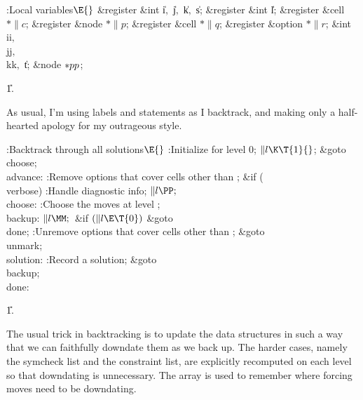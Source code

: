 \B{}:Local variables\X${}\E{}$\6
\&{register} \&{int} \|i${},{}$ \|j${},{}$ \|k${},{}$ \|s;\6
\&{register} \&{int} \|l;\6
\&{register} \&{cell} ${}{*}\|c{}$;\6
\&{register} \&{node} ${}{*}\|p{}$;\6
\&{register} \&{cell} ${}{*}\|q{}$;\6
\&{register} \&{option} ${}{*}\|r{}$;\6
\&{int} \\{ii}${},{}$ \\{jj}${},{}$ \\{kk}${},{}$ \|t;\6
\&{node} ${}{*}\\{pp}{}$;\par
\U1.\fi

As usual, I'm using labels and  statements as I backtrack,
and making only a half-hearted apology for my outrageous style.

\Y\B\4:Backtrack through all solutions\X${}\E{}$\6
:Initialize for level 0\X;\6
${}\|l\K\T{1}{}$;\5
\&{goto} \\{choose};\6
\4\\{advance}:\5
:Remove options that cover cells other than \X;\6
\&{if} (\\{verbose})\1\5
:Handle diagnostic info\X;\2\6
${}\|l\PP;{}$\6
\4\\{choose}:\5
:Choose the moves at level \X;\6
\4\\{backup}:\5
${}\|l\MM;{}$\6
\&{if} ${}(\|l\E\T{0}){}$\1\5
\&{goto} \\{done};\2\6
:Unremove options that cover cells other than \X;\6
\&{goto} \\{unmark};\6
\4\\{solution}:\5
:Record a solution\X;\6
\&{goto} \\{backup}; \\{done}:\par
\U1.\fi

The usual trick in backtracking is to update the data structures in such
a
way that we can faithfully downdate them as we back up. The harder cases,
namely the symcheck list and the constraint list, are explicitly recomputed on
each level so that downdating is unnecessary. The  array is
used to
remember where forcing moves need to be downdating.

